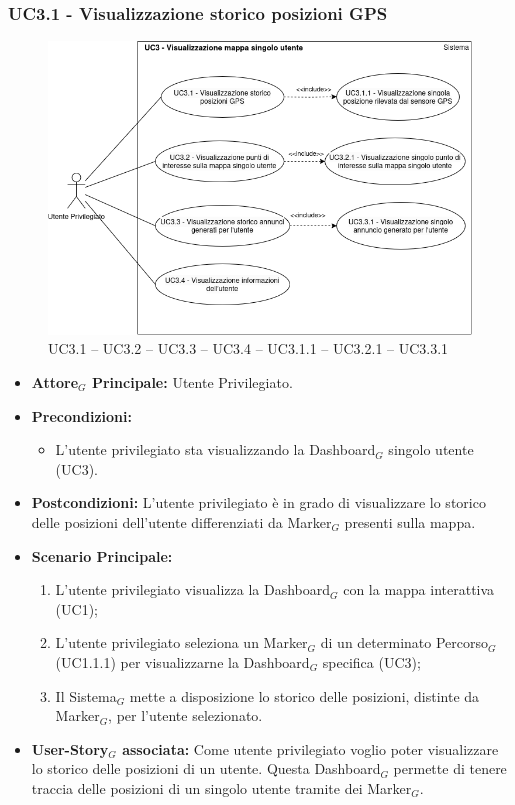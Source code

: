 \documentclass[10pt]{article}
\begin{document}
\begin{justify}

\subsubsection{\textbf{UC3.1 - Visualizzazione storico posizioni GPS}}
\begin{figure}[H]
    \centering
    \includegraphics[width=0.7\linewidth]{UC3.1234image.png}
    \caption{ UC3.1 -- UC3.2 -- UC3.3 -- UC3.4 -- UC3.1.1 -- UC3.2.1 -- UC3.3.1}
    \label{fig:UC3.1}
\end{figure}
\label{UC3.1}
\begin{itemize}
     \item \textbf{Attore$_G$ Principale:} Utente Privilegiato.
     \item \textbf{Precondizioni:}
        \begin{itemize}
    		\item L'utente privilegiato sta visualizzando la Dashboard$_G$ singolo utente (UC3).
        \end{itemize}
     \item \textbf{Postcondizioni:} L'utente privilegiato è in grado di visualizzare lo storico delle posizioni dell'utente differenziati da Marker$_G$ presenti sulla mappa.
     \item \textbf{Scenario Principale:}
        \begin{enumerate}
            \item L'utente privilegiato visualizza la Dashboard$_G$ con la mappa interattiva (UC1);
            \item L'utente privilegiato seleziona un Marker$_G$ di un determinato Percorso$_G$ (UC1.1.1) per visualizzarne la Dashboard$_G$ specifica (UC3);
            \item Il Sistema$_G$ mette a disposizione lo storico delle posizioni, distinte da Marker$_G$, per l'utente selezionato.
        \end{enumerate}
     \item \textbf{User-Story$_G$ associata:}
     Come utente privilegiato voglio poter visualizzare lo storico delle posizioni di un utente. Questa Dashboard$_G$ permette di tenere traccia delle posizioni di un singolo utente tramite dei Marker$_G$.
\end{itemize}

\end{justify}
\end{document}
